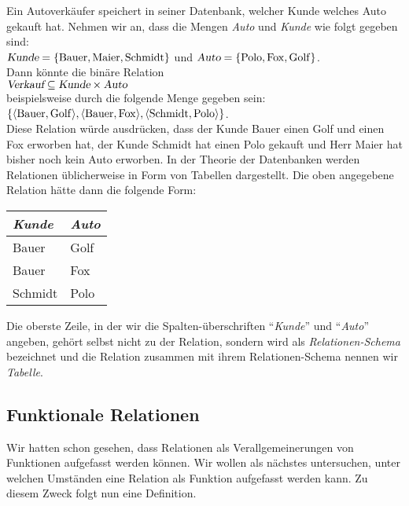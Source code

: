 \example
Ein Autoverk\"{a}ufer speichert in seiner Datenbank, welcher Kunde welches Auto gekauft hat.
Nehmen wir an, dass die Mengen \textsl{Auto} und \textsl{Kunde} wie folgt gegeben sind:
\\[0.2cm]
\hspace*{1.3cm}
$\textsl{Kunde} = \{ \mathrm{Bauer}, \mathrm{Maier}, \mathrm{Schmidt} \}$
\quad und \quad
$\textsl{Auto} = \{ \mathrm{Polo}, \mathrm{Fox}, \mathrm{Golf} \}$.
\\[0.2cm]
Dann k\"{o}nnte die bin\"{a}re Relation 
\\[0.2cm]
\hspace*{1.3cm}
$\textsl{Verkauf} \subseteq \textsl{Kunde} \times \textsl{Auto}$
\\[0.2cm]
beispielsweise durch die folgende Menge gegeben sein:
\\[0.2cm]
\hspace*{1.3cm}
$\{ \pair(\mathrm{Bauer}, \mathrm{Golf}), \pair(\mathrm{Bauer}, \mathrm{Fox}), \pair(\mathrm{Schmidt}, \mathrm{Polo})\}$.
\\[0.2cm]
Diese Relation w\"{u}rde ausdr\"{u}cken, dass der Kunde Bauer einen Golf und einen Fox erworben
hat, der Kunde Schmidt hat einen Polo gekauft und Herr Maier hat bisher noch kein Auto erworben.
In der Theorie der Datenbanken werden Relationen \"{u}blicherweise in Form von Tabellen
dargestellt. Die oben angegebene Relation h\"{a}tte dann die folgende Form:
\begin{center}
  \begin{tabular}[c]{|l|l|}
\hline
\textsl{Kunde} & \textsl{Auto} \\
\hline
\hline
  Bauer   & Golf \\
\hline
  Bauer   & Fox  \\
\hline
  Schmidt & Polo \\
\hline
  \end{tabular}
\end{center}
Die oberste Zeile, in der wir die Spalten-\"{u}berschriften ``\textsl{Kunde}'' und ``\textsl{Auto}''
angeben,  geh\"{o}rt selbst nicht zu der Relation, sondern wird als \emph{Relationen-Schema}
bezeichnet und die Relation zusammen mit ihrem Relationen-Schema nennen wir \emph{Tabelle}.  


\subsection{Funktionale Relationen}
Wir hatten schon gesehen, dass Relationen als Verallgemeinerungen von Funktionen aufgefasst werden
k\"{o}nnen.  Wir wollen als n\"{a}chstes untersuchen, unter welchen Umst\"{a}nden eine Relation als Funktion aufgefasst
werden kann.  Zu diesem Zweck folgt nun eine Definition.

